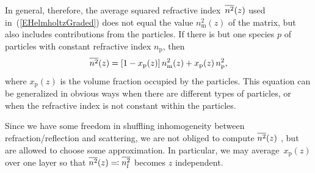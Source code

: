 In general, therefore, the average squared refractive index~$\overline{n^2}(z)$
used in~(\ref{EHelmholtzGraded})
does not equal the value $n_\text{m}^2(z)$ of the matrix,
but also includes contributions from the particles.
If there is but one species $p$ of particles
%
with constant refractive index $n_\text{p}$,
then
\begin{equation}\label{Enzx}
  \overline{n^2}(z) = [1-x_\text{p}(z)]\,n_\text{m}^2(z) + x_\text{p}(z)\, n_\text{p}^2,
\end{equation}
where $x_\text{p}(z)$ is the volume fraction occupied by the particles.
This equation can be generalized in obvious ways
when there are different types of particles,
or when the refractive index is not constant within the particles.

\mdbreakoff
{}

Since we have some freedom in shuffling inhomogeneity
between refraction/reflection and scattering,
we are not obliged to compute $\overline{n^2}(z)$ ,
but are allowed to choose some approximation.
In particular, we may average~$x_\text{p}(z)$
over one layer
so that $\overline{n^2}(z)\eqqcolon \overline{n_l^2}$ becomes $z$ independent.


